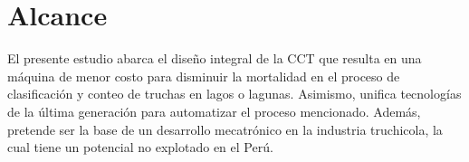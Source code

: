 \section{Alcance}

El presente estudio abarca el diseño integral de la CCT que resulta en una máquina de menor costo para disminuir la mortalidad en el proceso de clasificación y conteo de truchas en lagos o lagunas. Asimismo, unifica tecnologías de la última generación para automatizar el proceso mencionado. Además, pretende ser la base de un desarrollo mecatrónico en la industria truchicola, la cual tiene un potencial no explotado en el Perú.











